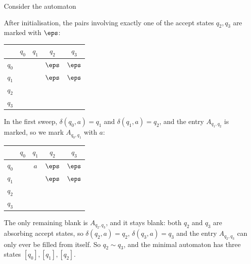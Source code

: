\begin{example}
	Consider the automaton
	\begin{center}
	\end{center}
	After initialisation, the pairs involving exactly one of the accept states $q_2, q_3$ are marked with $\eps$:
	\begin{center}
	\begin{tabular}{c|cccc}
		& $q_0$ & $q_1$ & $q_2$ & $q_3$ \\\hline
		$q_0$ & & & $\eps$ & $\eps$ \\
		$q_1$ & & & $\eps$ & $\eps$ \\
		$q_2$ & & & & \\
		$q_3$ & & & &
	\end{tabular}
	\end{center}
	In the first sweep, $\delta(q_0,a) = q_1$ and $\delta(q_1,a) = q_2$, and the entry $A_{q_1,q_2}$ is marked, so we mark $A_{q_0,q_1}$ with $a$:
	\begin{center}
	\begin{tabular}{c|cccc}
		& $q_0$ & $q_1$ & $q_2$ & $q_3$ \\\hline
		$q_0$ & & $a$ & $\eps$ & $\eps$ \\
		$q_1$ & & & $\eps$ & $\eps$ \\
		$q_2$ & & & & \\
		$q_3$ & & & &
	\end{tabular}
	\end{center}
	The only remaining blank is $A_{q_2,q_3}$, and it stays blank: both $q_2$ and $q_3$ are absorbing accept states, so $\delta(q_2,a) = q_2$, $\delta(q_3,a) = q_3$ and the entry $A_{q_2,q_3}$ can only ever be filled from itself. So $q_2 \sim q_3$, and the minimal automaton has three states $[q_0], [q_1], [q_2]$.


\end{example}
